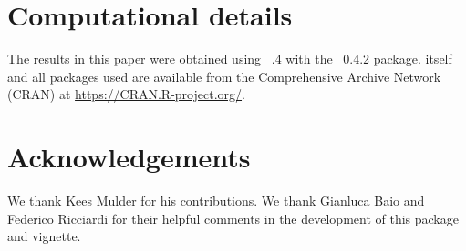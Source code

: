 \documentclass[nojss]{jss}
\begin{document}
\section*{Computational details}

The results in this paper were obtained using
~.4 with the
~0.4.2 package.  itself
and all packages used are available from the Comprehensive
 Archive Network (CRAN) at
\url{https://CRAN.R-project.org/}.


\section*{Acknowledgements}
We thank Kees Mulder for his contributions. We thank Gianluca Baio and Federico Ricciardi for their helpful comments in the development of this package and vignette.


\end{document}
